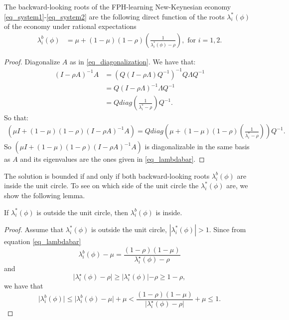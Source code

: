 \begin{lemma}\label{lemma_roots}
	The backward-looking roots of the FPH-learning New-Keynesian economy \eqref{eq_system1}-\eqref{eq_system2} are the following direct function of the roots $\lambda_i^*(\phi)$ of the economy under rational expectations
	\begin{align}
	\lambda^b_i(\phi) &=\mu + (1-\mu)(1-\rho)\left(\frac{1}{\lambda_i^*(\phi)-\rho}\right), \text{ for } i=1,2.\label{eq_lambdabar}
	\end{align}
\end{lemma}

\begin{proof}
Diagonalize $A$ as in \eqref{eq_diagonalization}. We have that:
\begin{align}
(I-\rho A)^{-1}A &= (Q(I-\rho\Lambda)Q^{-1})^{-1}Q \Lambda Q^{-1}\\
&= Q(I-\rho\Lambda)^{-1}\Lambda Q^{-1}\\
&= Q diag\left(\frac{1}{\lambda_i^*-\rho}\right) Q^{-1}.
\end{align}
So that:
\begin{align}
(\mu I + (1-\mu)(1-\rho)(I-\rho A)^{-1}A) = Qdiag\left(\mu + (1-\mu)(1-\rho)\left(\frac{1}{\lambda_i^*-\rho}\right)  \right)Q^{-1}.
\end{align}
So $(\mu I + (1-\mu)(1-\rho)(I-\rho A)^{-1}A)$ is diagonalizable in the same basis as $A$ and its eigenvalues are the ones given in \eqref{eq_lambdabar}.
\end{proof}

The solution is bounded if and only if both backward-looking roots $\lambda^b_i(\phi)$ are inside the unit circle. To see on which side of the unit circle the $\lambda_i^*(\phi)$ are, we show the following lemma.

\begin{lemma}
If $\lambda_i^*(\phi)$ is outside the unit circle, then $\lambda^b_i(\phi)$ is inside.
\end{lemma}
		
\begin{proof}
Assume that $\lambda_i^*(\phi)$ is outside the unit circle, $|\lambda_i^*(\phi)|>1$. Since from equation \eqref{eq_lambdabar}
	\begin{equation}
	\lambda^b_i(\phi)-\mu=\frac{(1-\rho)(1-\mu)}{\lambda_i^{\star}(\phi)-\rho}
	\end{equation}
	and
	\begin{equation}
	\lvert \lambda_i^\star(\phi)-\rho\lvert \geq \lvert \lambda_i^\star(\phi)\lvert -\rho \geq 1-\rho,
	\end{equation}
	we have that
	\begin{equation}
\lvert\lambda^b_i(\phi)\rvert \leq\lvert \lambda^b_i(\phi) -\mu\rvert +\mu<\frac{(1-\rho)(1-\mu)}{\lvert \lambda_i^\star(\phi)-\rho\lvert}+\mu\leq1.
	\end{equation}
\end{proof}

